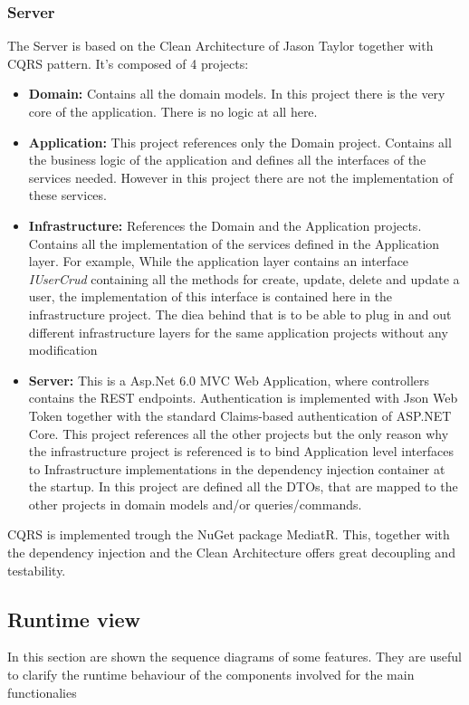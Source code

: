 \documentclass{article}
\begin{document}
\subsubsection{Server}	
\label{sec:server}
The Server is based on the Clean Architecture of Jason Taylor together with CQRS pattern. It's composed of 4 projects: 
\begin{itemize}
	        \item \textbf{ Domain:} Contains all the domain models. In this project there is the very core of the application. There is no logic at all here.
	        \item \textbf{ Application:} This project references only the Domain project. Contains all the business logic of the application and defines all the interfaces of the services needed. However in this project there are not the implementation of these services.
	        \item \textbf{ Infrastructure:} References the Domain and the Application projects. Contains all the implementation of the services defined in the Application layer. For example, While the application layer contains an interface \textit{IUserCrud} containing all the methods for create, update, delete and update a user, the implementation of this interface is contained here in the infrastructure project. The diea behind that is to be able to plug in and out different infrastructure layers for the same application projects without any modification
    	    \item \textbf{ Server:} This is a Asp.Net 6.0 MVC Web Application, where controllers contains the REST endpoints. Authentication is implemented with Json Web Token together with the standard Claims-based authentication of ASP.NET Core. This project references all the other projects but the only reason why the infrastructure project is referenced is to bind Application level interfaces to Infrastructure implementations in the dependency injection container at the startup. In this project are defined all the DTOs, that are mapped to the other projects in domain models and/or queries/commands.
\end{itemize}
CQRS is implemented trough the NuGet package MediatR. This, together with the dependency injection and the Clean Architecture offers great decoupling and testability.
\newpage
\subsection{Runtime view}
\label{sec:runtime-view}
In this section are shown the sequence diagrams of some features. They are useful to clarify the runtime behaviour of the components involved for the main functionalies
\end{document}
